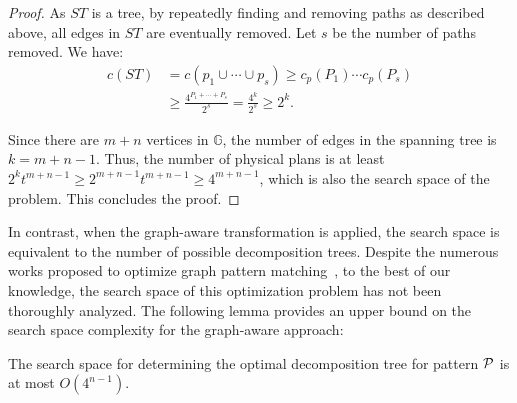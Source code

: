 {\begin{proof}
    As $ST$ is a tree, by repeatedly finding and removing paths as described above, all edges in $ST$ are eventually removed. Let $s$ be the number of paths removed. We have:
    \begin{equation*}
    \begin{split}
        c(ST) & = c(p_1 \cup \cdots \cup p_s) \geq c_p(P_1) \cdots c_p(P_s) \\
        & \geq \frac{4^{P_1 + \cdots + P_s}}{2^s} = \frac{4^{k}}{2^s} \geq 2^{k}.
    \end{split}
    \end{equation*}

    Since there are $m + n$ vertices in $\mathbb{G}$, the number of edges in the spanning tree is $k = m + n - 1$. Thus, the number of physical plans is at least $2^{k}t^{m+n-1} \geq 2^{m+n-1}t^{m+n-1} \geq 4^{m+n-1}$, which is also the search space of the problem. This concludes the proof.
\end{proof}
}

In contrast, when the graph-aware transformation is applied, the search space is equivalent to the number of possible decomposition trees. Despite the numerous works proposed to optimize graph pattern matching~\cite{huge,GLogS,mhedhbi2019optimizing}, to the best of our knowledge, the search space of this optimization problem has not been thoroughly analyzed. The following lemma provides an upper bound on the search space complexity for the graph-aware approach:


\begin{lemma}
\label{lem:complexity-of-graph-aware}
The search space for determining the optimal decomposition tree for pattern $\mathcal{P}$ is at most $O(4^{n-1})$.
\end{lemma}


